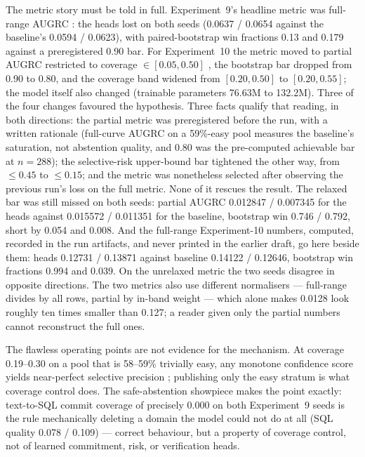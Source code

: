 \documentclass[10pt,a4paper]{article}
\begin{document}
The metric story must be told in full. Experiment~9's headline metric was
full-range AUGRC \cite{traub2024}: the heads lost on both seeds (0.0637 /
0.0654 against the baseline's 0.0594 / 0.0623), with paired-bootstrap win
fractions 0.13 and 0.179 against a preregistered 0.90 bar. For Experiment~10
the metric moved to partial AUGRC restricted to coverage
$\in[0.05,0.50]$ \cite{galil2023}, the bootstrap bar dropped from 0.90 to 0.80,
and the coverage band widened from $[0.20,0.50]$ to $[0.20,0.55]$; the model
itself also changed (trainable parameters 76.63M to 132.2M). Three of the four
changes favoured the hypothesis. Three facts qualify that reading, in both
directions: the partial metric was preregistered before the run, with a written
rationale (full-curve AUGRC on a 59\%-easy pool measures the baseline's
saturation, not abstention quality, and 0.80 was the pre-computed achievable
bar at $n=288$); the selective-risk upper-bound bar tightened the other way,
from $\le 0.45$ to $\le 0.15$; and the metric was nonetheless selected after
observing the previous run's loss on the full metric. None of it rescues the
result. The relaxed bar was still missed on both seeds: partial AUGRC 0.012847
/ 0.007345 for the heads against 0.015572 / 0.011351 for the baseline,
bootstrap win 0.746 / 0.792, short by 0.054 and 0.008. And the full-range
Experiment-10 numbers, computed, recorded in the run artifacts, and never
printed in the earlier draft, go here beside them: heads 0.12731 / 0.13871
against baseline 0.14122 / 0.12646, bootstrap win fractions 0.994 and 0.039.
On the unrelaxed metric the two seeds disagree in opposite directions. The two
metrics also use different normalisers --- full-range divides by all rows,
partial by in-band weight --- which alone makes 0.0128 look roughly ten times
smaller than 0.127; a reader given only the partial numbers cannot reconstruct
the full ones.

The flawless operating points are not evidence for the mechanism. At coverage
0.19--0.30 on a pool that is 58--59\% trivially easy, any monotone confidence
score yields near-perfect selective precision \cite{geifman2017}; publishing
only the easy stratum is what coverage control does. The safe-abstention
showpiece makes the point exactly: text-to-SQL commit coverage of precisely
0.000 on both Experiment~9 seeds is the rule mechanically deleting a domain
the model could not do at all (SQL quality 0.078 / 0.109) --- correct
behaviour, but a property of coverage control, not of learned commitment,
risk, or verification heads.
\end{document}
